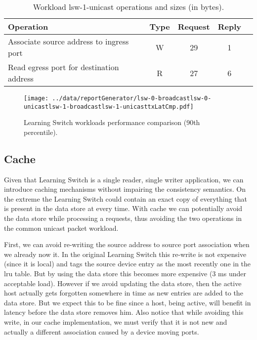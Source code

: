 \begin{table}[ht]
\small
\centering 
\begin{tabular}{l c c c c}
Operation & Type & Request & Reply \\ \toprule 
Associate source address to ingress port & W & 29 & 1\\
Read egress port for destination address & R & 27 & 6 \\ \bottomrule
\end{tabular}
\caption[Workload lsw-1-unicast operations]{Workload lsw-1-unicast operations and sizes (in bytes).}
\label{table:lsw1:unicast}
\end{table}

\begin{figure}[ht]
\centering
\texttt{[image: ../data/reportGenerator/lsw-0-broadcastlsw-0-unicastlsw-1-broadcastlsw-1-unicasttxLatCmp.pdf]}
\caption[Learning Switch workloads performance comparison]{Learning
  Switch workloads performance comparison (90th percentile). }
\label{fig:lsw:comparison}
\end{figure}

\subsection{Cache}
\label{sec:ls:cache}
Given that Learning Switch is a single reader, single writer application, we can introduce caching mechanisms without impairing the consistency semantics. 
On the extreme the Learning Switch could contain an exact copy of everything that is present in the data store at every time.  
With cache we can potentially avoid the data store while processing a requests, thus avoiding the two operations in the common unicast packet workload. 

First, we can avoid re-writing the source address to source port association when we already now it. 
In the original Learning Switch this re-write is not expensive (since it is local) and tags the source device  entry as the most recently one in the \gls{lru} table. 
But by using the data store this  becomes more expensive (3 ms under acceptable load).
However if we avoid updating the data store, then  the active host actually gets forgotten somewhere in time as new entries are added to the data store.  
But we expect this to be fine since a host, being active, will benefit in latency before the data store removes him.
Also notice that while avoiding this write, in our cache implementation,  we must verify that  it is not new and actually a different association caused by a device moving ports.


